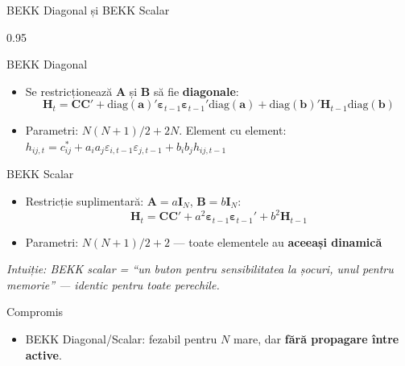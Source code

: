 \documentclass[9pt, aspectratio=169, t]{beamer}
\begin{document}
\begin{frame}{BEKK Diagonal și BEKK Scalar}
    \begin{cminipage}{0.95\textwidth}
    \vspace{-2mm}
    {\scriptsize
    \begin{block}{BEKK Diagonal}
        \begin{itemize}\setlength{\itemsep}{0pt}
            \item Se restricționează $\mathbf{A}$ și $\mathbf{B}$ să fie \textbf{diagonale}:
            \[
                \mathbf{H}_t = \mathbf{C}\mathbf{C}' + \text{diag}(\mathbf{a})'\boldsymbol{\varepsilon}_{t-1}\boldsymbol{\varepsilon}_{t-1}'\text{diag}(\mathbf{a}) + \text{diag}(\mathbf{b})'\mathbf{H}_{t-1}\text{diag}(\mathbf{b})
            \]
            \item Parametri: $N(N+1)/2 + 2N$. Element cu element: $h_{ij,t} = c_{ij}^* + a_i a_j \varepsilon_{i,t-1}\varepsilon_{j,t-1} + b_i b_j h_{ij,t-1}$
        \end{itemize}
    \end{block}
    \vspace{-1mm}
    \begin{block}{BEKK Scalar}
        \begin{itemize}\setlength{\itemsep}{0pt}
            \item Restricție suplimentară: $\mathbf{A} = a\mathbf{I}_N$, $\mathbf{B} = b\mathbf{I}_N$:
            \[
                \mathbf{H}_t = \mathbf{C}\mathbf{C}' + a^2\boldsymbol{\varepsilon}_{t-1}\boldsymbol{\varepsilon}_{t-1}' + b^2\mathbf{H}_{t-1}
            \]
            \item Parametri: $N(N+1)/2 + 2$ --- toate elementele au \textbf{aceeași dinamică}
        \end{itemize}
        \textit{Intuiție: BEKK scalar = ``un buton pentru sensibilitatea la șocuri, unul pentru memorie'' --- identic pentru toate perechile.}
    \end{block}
    \vspace{-1mm}
    \begin{alertblock}{Compromis}
        \begin{itemize}\setlength{\itemsep}{0pt}
            \item BEKK Diagonal/Scalar: fezabil pentru $N$ mare, dar \textbf{fără propagare între active}.
        \end{itemize}
    \end{alertblock}
    }
    \end{cminipage}
\end{frame}
\end{document}
